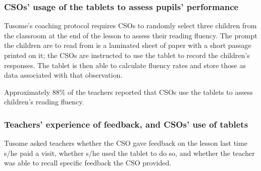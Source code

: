 \documentclass[11pt]{article}
\begin{document}
    \hypertarget{csos-usage-of-the-tablets-to-assess-pupils-performance}{%
\subsubsection{CSOs' usage of the tablets to assess pupils'
performance}\label{csos-usage-of-the-tablets-to-assess-pupils-performance}}

Tusome's coaching protocol requires CSOs to randomly select three
children from the classroom at the end of the lesson to assess their
reading fluency. The prompt the children are to read from is a laminated
sheet of paper with a short passage printed on it; the CSOs are
instructed to use the tablet to record the children's responses. The
tablet is then able to calculate fluency rates and store those as data
associated with that observation.

Approximately 88\% of the teachers reported that CSOs use the tablets to
assess children's reading fluency.

    \hypertarget{teachers-experience-of-feedback-and-csos-use-of-tablets}{%
\subsubsection{Teachers' experience of feedback, and CSOs' use of
tablets}\label{teachers-experience-of-feedback-and-csos-use-of-tablets}}

Tusome asked teachers whether the CSO gave feedback on the lesson last
time s/he paid a visit, whether s/he used the tablet to do so, and
whether the teacher was able to recall specific feedback the CSO
provided.
\end{document}
